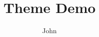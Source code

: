 \documentclass{beamer}
\title{Theme Demo}
\author{John}
\begin{document}
\begin{frame}
\titlepage
\end{frame}
\end{document}
